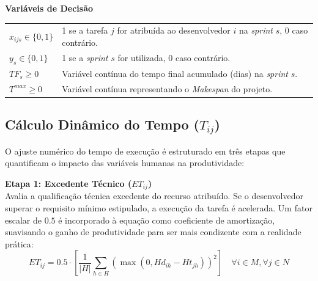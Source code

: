 \documentclass[a4paper,11pt]{article}
\begin{document}
\vspace{0.3cm}
\noindent\textbf{Variáveis de Decisão}
\begin{center}
    \begin{tabular}{p{2.5cm} p{12cm}}
        $x_{ijs} \in \{0, 1\}$ & 1 se a tarefa $j$ for atribuída ao desenvolvedor $i$ na \textit{sprint} $s$, 0 caso contrário. \\
        $y_s \in \{0, 1\}$ & 1 se a \textit{sprint} $s$ for utilizada, 0 caso contrário. \\
        $TF_s \ge 0$ & Variável contínua do tempo final acumulado (dias) na \textit{sprint} $s$. \\
        $T^{max} \ge 0$ & Variável contínua representando o \textit{Makespan} do projeto.
    \end{tabular}
\end{center}

\subsection{Cálculo Dinâmico do Tempo ($T_{ij}$)}

O ajuste numérico do tempo de execução é estruturado em três etapas que quantificam 
o impacto das variáveis humanas na produtividade:

\vspace{0.2cm}
\noindent\textbf{Etapa 1: Excedente Técnico ($ET_{ij}$)} \\
Avalia a qualificação técnica excedente do recurso atribuído. Se o desenvolvedor 
superar o requisito mínimo estipulado, a execução da tarefa é acelerada. Um fator 
escalar de $0.5$ é incorporado à equação como coeficiente de amortização, suavisando
o ganho de produtividade para ser mais condizente com a realidade prática:
\begin{equation}
    ET_{ij} = 0.5 \cdot \left[ \frac{1}{|H|} \sum_{h \in H} \left(\max(0, Hd_{ih} - Ht_{jh})\right)^2 \right] \quad \forall i \in M, \forall j \in N
\end{equation}
\end{document}
